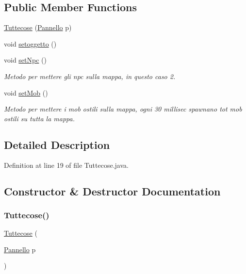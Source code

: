 \subsection*{Public Member Functions}
\begin{DoxyCompactItemize}
\item 
\hyperlink{classa_1_1survival_1_1game_1_1_tuttecose_aa5ee141fc6d9f2478a24cf33674731ea}{Tuttecose} (\hyperlink{classa_1_1survival_1_1game_1_1_pannello}{Pannello} p)
\item 
void \hyperlink{classa_1_1survival_1_1game_1_1_tuttecose_a709a0c0f5e1492a7d71d4548e5668707}{setoggetto} ()
\item 
void \hyperlink{classa_1_1survival_1_1game_1_1_tuttecose_a80676eb19cc9cd7bacacb02ac21c11c7}{set\+Npc} ()
\begin{DoxyCompactList}\small\item\em Metodo per mettere gli npc sulla mappa, in questo caso 2. \end{DoxyCompactList}\item 
void \hyperlink{classa_1_1survival_1_1game_1_1_tuttecose_ab2ada56f46e12f2fe9e2ec9b9dcf24b2}{set\+Mob} ()
\begin{DoxyCompactList}\small\item\em Metodo per mettere i mob ostili sulla mappa, ogni 30 millisec spawnano tot mob ostili su tutta la mappa. \end{DoxyCompactList}\end{DoxyCompactItemize}


\subsection{Detailed Description}


Definition at line 19 of file Tuttecose.\+java.



\subsection{Constructor \& Destructor Documentation}
\mbox{\label{classa_1_1survival_1_1game_1_1_tuttecose_aa5ee141fc6d9f2478a24cf33674731ea}} 
\subsubsection{\texorpdfstring{Tuttecose()}{Tuttecose()}}
{\footnotesize\ttfamily \hyperlink{classa_1_1survival_1_1game_1_1_tuttecose}{Tuttecose} (\begin{DoxyParamCaption}\item[{\hyperlink{classa_1_1survival_1_1game_1_1_pannello}{Pannello}}]{p }\end{DoxyParamCaption})}



